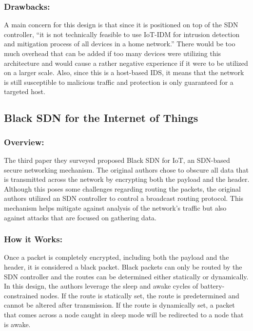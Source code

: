 \subsubsection {Drawbacks:}

A main concern for this design is that since it is positioned on top of the SDN controller, “it is not technically feasible to use IoT-IDM for intrusion detection and mitigation process of all devices in a home network.” \cite {nobakht2016host} There would be too much overhead that can be added if too many devices were utilizing this architecture and would cause a rather negative experience if it were to be utilized on a larger scale. Also, since this is a host-based IDS, it means that the network is still susceptible to malicious traffic and protection is only guaranteed for a targeted host. 

\subsection {Black SDN for the Internet of Things}
\subsubsection {Overview:}

The third paper they surveyed proposed Black SDN for IoT, an SDN-based secure networking mechanism. The original authors chose to obscure all data that is transmitted across the network by encrypting both the payload and the header. Although this poses some challenges regarding routing the packets, the original authors utilized an SDN controller to control a broadcast routing protocol. This mechanism helps mitigate against analysis of the network’s traffic but also against attacks that are focused on gathering data.

\subsubsection {How it Works:}

Once a packet is completely encrypted, including both the payload and the header, it is considered a black packet. Black packets can only be routed by the SDN controller and the routes can be determined either statically or dynamically. In this design, the authors leverage the sleep and awake cycles of battery-constrained nodes. If the route is statically set, the route is predetermined and cannot be altered after transmission. If the route is dynamically set, a packet that comes across a node caught in sleep mode will be redirected to a node that is awake.

